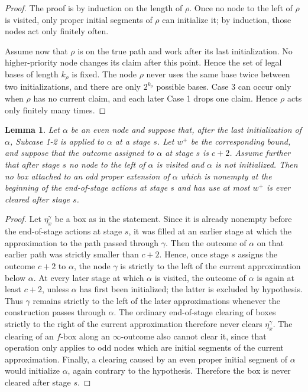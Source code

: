 \documentclass[11pt]{amsart}
\newtheorem{lemma}[theorem]{Lemma}
\begin{document}
\begin{proof}
The proof is by induction on the length of $\rho$.  Once no node to
the left of $\rho$ is visited, only proper
initial segments of $\rho$ can initialize it; by induction, those nodes act
only finitely often.

Assume now that $\rho$ is on the true path and work after its last
initialization.  No higher-priority node changes its claim after this point.  Hence the set of legal bases of length
$k_\rho$ is fixed.  The node $\rho$ never uses the same base twice between two
initializations, and there are only $2^{k_\rho}$ possible bases.  Case 3 can
occur only when $\rho$ has no current claim, and each later Case 1 drops one
claim.  Hence $\rho$ acts only finitely many times.
\end{proof}


\begin{lemma}\label{extension-jump-main}
Let $\alpha$ be an even node and suppose that, after the last initialization of
$\alpha$, Subcase 1-2 is applied to $\alpha$ at a stage $s$.  Let
$w^+$ be the corresponding bound, and suppose that the outcome assigned to
$\alpha$ at stage $s$ is $c+2$.  Assume further that after stage $s$ no node to
the left of $\alpha$ is visited and $\alpha$ is not initialized.  Then no box
attached to an odd proper extension of $\alpha$ which is nonempty at the
beginning of the end-of-stage actions at stage $s$ and has use at most $w^+$ is
ever cleared after stage $s$.
\end{lemma}

\begin{proof}
Let $\eta_x^\gamma$ be a box as in the statement.  Since it is already nonempty
before the end-of-stage actions at stage $s$, it was filled at an earlier stage
at which the approximation to the path passed through $\gamma$. Then the outcome of $\alpha$ on that earlier path
was strictly smaller than $c+2$.  Hence, once stage $s$ assigns the outcome
$c+2$ to $\alpha$, the node $\gamma$ is strictly to the left of the current
approximation below $\alpha$.
At every later stage at which $\alpha$ is visited, the outcome of $\alpha$ is
again at least $c+2$, unless $\alpha$ has first been initialized; the latter is
excluded by hypothesis.  Thus $\gamma$ remains strictly to the left of the later
approximations whenever the construction passes through $\alpha$.  The ordinary
end-of-stage clearing of boxes strictly to the right of the current
approximation therefore never clears $\eta_x^\gamma$.  The clearing of an
$f$-box along an $\infty$-outcome also cannot clear it, since that operation
only applies to odd nodes which are initial segments of the current
approximation.
Finally, a clearing caused by an even proper initial segment of $\alpha$ would
initialize $\alpha$, again contrary to the hypothesis.  Therefore the box is
never cleared after stage $s$.
\end{proof}
\end{document}
